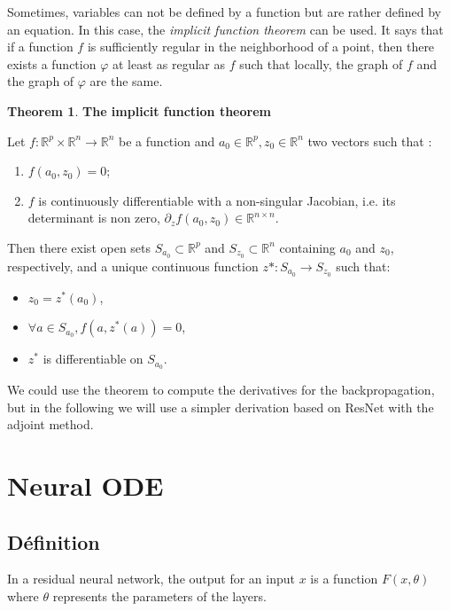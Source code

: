 \documentclass[10pt,a4paper]{article}
\theoremstyle{definition}
\theoremstyle{definition}
\newtheorem{theorem}{Theorem}
\theoremstyle{definition}
\begin{document}
Sometimes, variables can not be defined by a function but are rather defined by an equation. In this case, the \textit{implicit function theorem} can be used. It says that if a function $f$ is sufficiently regular in the neighborhood of a point, then there exists a function $\varphi$ at least as regular as $f$ such that locally, the graph of $f$ and the graph of $\varphi$ are the same.

\begin{theorem}{\textbf{The implicit function theorem}}

Let $f: \mathbb{R}^p \times \mathbb{R}^n \rightarrow \mathbb{R}^n$ be a function and $a_0 \in \mathbb{R}^p , z_0 \in \mathbb{R}^n$ two vectors such that :

\begin{enumerate}
\item $f(a_0,z_0) = 0$;
\item $f$ is continuously differentiable with a non-singular Jacobian, i.e. its determinant is non zero, $\partial_z f(a_0,z_0) \in \mathbb{R}^{n \times n}$.
\end{enumerate}
Then there exist open sets $S_{a_0} \subset \mathbb{R}^p$ and $S_{z_0} \subset \mathbb{R}^n$ containing $a_0$ and $z_0$, respectively, and a unique continuous function $z*:S_{a_0} \rightarrow S_{z_0}$ such that:
\begin{itemize}
\item $z_0=z^*(a_0)$,
\item $ \forall a \in S_{a_0}, f(a,z^*(a))=0$,
\item $z^*$ is differentiable on $S_{a_0}$.
\end{itemize}
\end{theorem}

We could use the theorem to compute the derivatives for the backpropagation, but in the following we will use a simpler derivation based on ResNet with the adjoint method.

\section{Neural ODE}

\subsection{Définition}


In a residual neural network, the output for an input $x$ is a function $F(x, \theta)$ where $\theta$ represents the parameters of the layers. 
\end{document}
